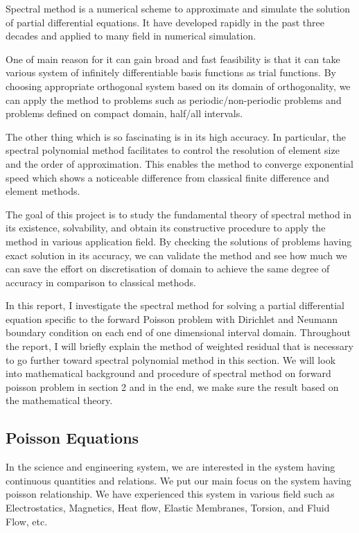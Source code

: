 

Spectral method is a numerical scheme to approximate and simulate the solution of partial differential equations. It have developed rapidly in the past three decades and applied to many field in numerical simulation.

One of main reason for it can gain broad and fast feasibility is that it can take various system of infinitely differentiable basis functions as trial functions. By choosing appropriate orthogonal system based on its domain of orthogonality, we can apply the method to problems such as periodic/non-periodic problems and problems defined on compact domain, half/all intervals.

The other thing which is so fascinating is in its high accuracy. In particular, the spectral polynomial method facilitates to control the resolution of element size and the order of approximation. This enables the method to converge exponential speed which shows a noticeable difference from classical finite difference and element methods.

The goal of this project is to study the fundamental theory of spectral method in its existence, solvability, and obtain its constructive procedure to apply the method in various application field. By checking the solutions of problems having exact solution in its accuracy, we can validate the method and see how much we can save the effort on discretisation of domain to achieve the same degree of accuracy in comparison to classical methods.

In this report, I investigate the spectral method for solving a partial differential equation specific to the forward Poisson problem with Dirichlet and Neumann boundary condition on each end of one dimensional interval domain. Throughout the report, I will briefly explain the method of weighted residual that is necessary to go further toward spectral polynomial method in this section. We will look into mathematical background and procedure of spectral method on forward poisson problem in section 2 and in the end, we make sure the result based on the mathematical theory.


\subsection{Poisson Equations}

In the science and engineering system, we are interested in the system having continuous quantities and relations. We put our main focus on the system having poisson relationship. We have experienced this system in various field such as Electrostatics, Magnetics, Heat flow, Elastic Membranes, Torsion, and Fluid Flow, etc.


